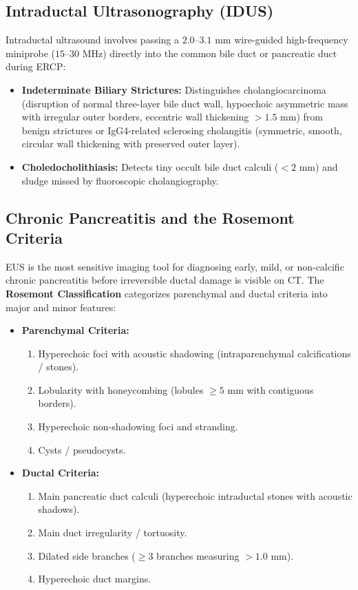 \documentclass[11pt,a4paper]{article}
\begin{document}
\subsection{Intraductal Ultrasonography (IDUS)}
Intraductal ultrasound involves passing a $2.0\text{--}3.1\text{ mm}$ wire-guided high-frequency miniprobe ($15\text{--}30\text{ MHz}$) directly into the common bile duct or pancreatic duct during ERCP:
\begin{itemize}[leftmargin=2em]
    \item \textbf{Indeterminate Biliary Strictures:} Distinguishes cholangiocarcinoma (disruption of normal three-layer bile duct wall, hypoechoic asymmetric mass with irregular outer borders, eccentric wall thickening $> 1.5\text{ mm}$) from benign strictures or IgG4-related sclerosing cholangitis (symmetric, smooth, circular wall thickening with preserved outer layer).
    \item \textbf{Choledocholithiasis:} Detects tiny occult bile duct calculi ($< 2\text{ mm}$) and sludge missed by fluoroscopic cholangiography.
\end{itemize}

\subsection{Chronic Pancreatitis and the Rosemont Criteria}
EUS is the most sensitive imaging tool for diagnosing early, mild, or non-calcific chronic pancreatitis before irreversible ductal damage is visible on CT. The \textbf{Rosemont Classification} categorizes parenchymal and ductal criteria into major and minor features:
\begin{itemize}[leftmargin=2em]
    \item \textbf{Parenchymal Criteria:}
    \begin{enumerate}
        \item Hyperechoic foci with acoustic shadowing (intraparenchymal calcifications / stones).
        \item Lobularity with honeycombing (lobules $\ge 5\text{ mm}$ with contiguous borders).
        \item Hyperechoic non-shadowing foci and stranding.
        \item Cysts / pseudocysts.
    \end{enumerate}
    \item \textbf{Ductal Criteria:}
    \begin{enumerate}
        \item Main pancreatic duct calculi (hyperechoic intraductal stones with acoustic shadows).
        \item Main duct irregularity / tortuosity.
        \item Dilated side branches ($\ge 3$ branches measuring $> 1.0\text{ mm}$).
        \item Hyperechoic duct margins.
    \end{enumerate}
\end{itemize}
\end{document}
